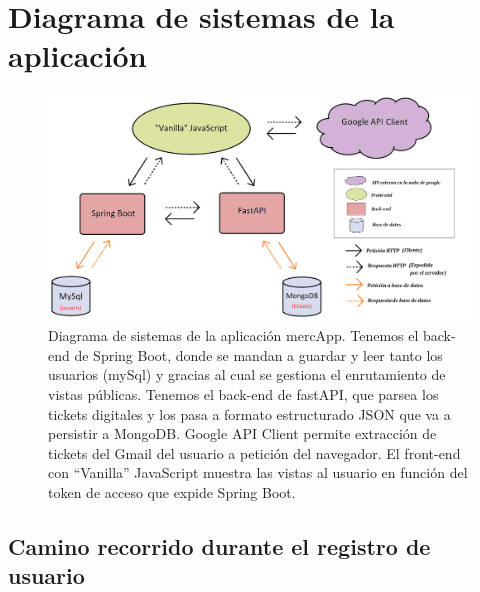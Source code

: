 \documentclass[a4paper,12pt]{report}
\begin{document}
		
		
		
		

		

		
		\section{Diagrama de sistemas de la aplicación}
		
				
		\setlength{\belowcaptionskip}{3pt}
		\FloatBarrier
		\begin{figure}[H]
			\centering
			\includegraphics[width=1\textwidth]{img/diagramaSistemesAplicacioMercapp.png}
			\caption{Diagrama de sistemas de la aplicación mercApp. Tenemos el back-end de Spring Boot, donde se mandan a guardar y leer tanto los usuarios (mySql) y gracias al cual se gestiona el enrutamiento de vistas públicas. Tenemos el back-end de fastAPI, que parsea los tickets digitales y los pasa a formato estructurado JSON que va a persistir a MongoDB. Google API Client permite extracción de tickets del Gmail del usuario a petición del navegador. El front-end con ``Vanilla'' JavaScript muestra las vistas al usuario en función del token de acceso que expide Spring Boot.}

			
			\label{fig:diagramaSistemesAplicacioMercapp} 
		\end{figure}
		\FloatBarrier
				
				
			\subsection{Camino recorrido durante el registro de usuario}
				
\end{document}
